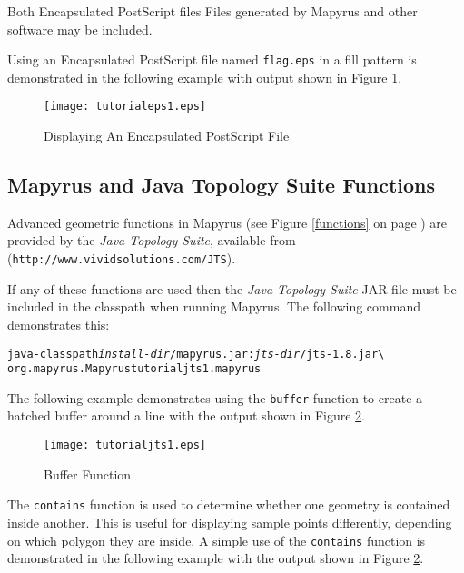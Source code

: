 Both Encapsulated PostScript files
Files generated by Mapyrus and other software may be included.

Using an Encapsulated PostScript file named \texttt{flag.eps}
in a fill pattern is demonstrated in the following example
with output shown in Figure \ref{tutorialeps1}.



\begin{figure}[htb]
\texttt{[image: tutorialeps1.eps]}
\caption{Displaying An Encapsulated PostScript File}
\label{tutorialeps1}
\end{figure}

\subsection{Mapyrus and Java Topology Suite Functions}
\label{tutorialjts}

Advanced geometric functions in Mapyrus
(see Figure \ref{functions} on page \pageref{functions})
are provided by the
\textit{Java Topology Suite},
available from
(\texttt{http://www.vividsolutions.com/JTS}).

If any of these functions are used then the
\textit{Java Topology Suite} JAR file must be included in the
classpath when running Mapyrus.  The following command demonstrates this:

\begin{alltt}
java -classpath \textit{install-dir}/mapyrus.jar:\textit{jts-dir}/jts-1.8.jar \textbackslash
  org.mapyrus.Mapyrus tutorialjts1.mapyrus
\end{alltt}

The following example demonstrates using the \texttt{buffer} function to
create a hatched buffer around a line
with the output shown in Figure \ref{tutorialjts1}.



\begin{figure}[htb]
\texttt{[image: tutorialjts1.eps]}
\caption{Buffer Function}
\label{tutorialjts1}
\end{figure}

The \texttt{contains} function is used to determine whether one geometry
is contained inside another.  This is useful for displaying sample points
differently, depending on which polygon they are inside.
A simple use of the \texttt{contains} function is
demonstrated in the following example
with the output shown in Figure \ref{tutorialjts1}.

